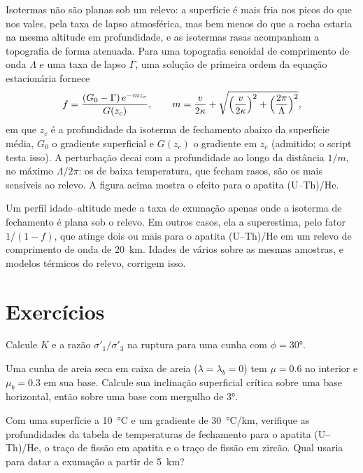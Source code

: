 Isotermas não são planas sob um relevo: a superfície é mais fria nos picos
do que nos vales, pela taxa de lapso atmosférica, mas bem menos do que a rocha
estaria na mesma altitude em profundidade, e as isotermas rasas
acompanham a topografia de forma atenuada. Para uma topografia senoidal de
comprimento de onda $\Lambda$ e uma taxa de lapso $\Gamma$, uma solução de primeira ordem da
equação estacionária fornece
\[
  f = \frac{(G_0 - \Gamma)\,e^{-mz_c}}{G(z_c)},\qquad
  m = \frac{v}{2\kappa} + \sqrt{\Bigl(\frac{v}{2\kappa}\Bigr)^2 +
  \Bigl(\frac{2\pi}{\Lambda}\Bigr)^2},
\]
em que $z_c$ é a profundidade da isoterma de fechamento abaixo da superfície média,
$G_0$ o gradiente superficial e $G(z_c)$ o gradiente em $z_c$ (admitido;
o script testa isso). A perturbação decai com a profundidade ao longo da
distância $1/m$, no máximo $\Lambda/2\pi$: os  de baixa temperatura,
que fecham rasos, são os mais sensíveis ao relevo. A figura acima mostra o efeito
para o apatita (U--Th)/He.

Um perfil idade--altitude mede a taxa de exumação apenas onde a isoterma de
fechamento é plana sob o relevo. Em outros casos, ela a superestima, pelo fator $1/(1 - f)$, que atinge
dois ou mais para o apatita (U--Th)/He em um relevo de comprimento de onda de \qty{20}{km}.
Idades de vários  sobre as mesmas amostras, e modelos térmicos
do relevo, corrigem isso.

\section{Exercícios}

\begin{exercise}[$\star$]\label{exo:b3:orogenic-wedges:1}
Calcule $K$ e a razão $\sigma'_1/\sigma'_3$ na ruptura para uma cunha com
$\phi = \ang{30}$.
\end{exercise}

\begin{exercise}[$\star$]\label{exo:b3:orogenic-wedges:2}
Uma cunha de areia seca em caixa de areia ($\lambda = \lambda_b = 0$) tem $\mu = 0.6$
no interior e $\mu_b = 0.3$ em sua base. Calcule sua inclinação superficial crítica sobre uma
base horizontal, então sobre uma base com mergulho de \ang{3}.
\end{exercise}

\begin{exercise}[$\star$]\label{exo:b3:orogenic-wedges:3}
Com uma superfície a \qty{10}{\celsius} e um gradiente de \qty{30}{\celsius/km},
verifique as profundidades da tabela de temperaturas de fechamento para o apatita
(U--Th)/He, o traço de fissão em apatita e o traço de fissão em zircão. Qual
 usaria para datar a exumação a partir de \qty{5}{km}?
\end{exercise}

